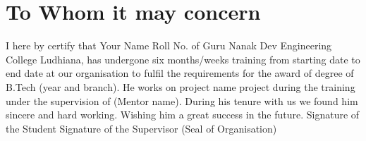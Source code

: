 \section*{To Whom it may concern}                        %
I here by certify that Your Name Roll No.   of Guru Nanak Dev Engineering College Ludhiana, has undergone six months/weeks training from starting date to end date at our organisation to fulfil the requirements for the award of degree of B.Tech (year and branch). He works on {project name} project during the training under the supervision of (Mentor name). During his tenure with us we found him sincere and hard working. Wishing him a great success in the future.
\student
Signature of the Student
\supervisor
Signature of the Supervisor 
\stamp
(Seal of Organisation)
